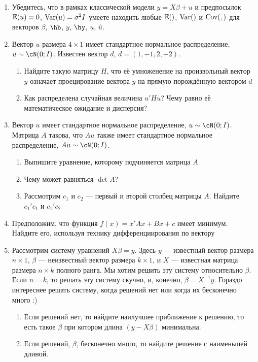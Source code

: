 \documentclass[12pt, a4paper]{article}
\theoremstyle{definition}
\begin{document}
\begin{enumerate}

\item Убедитесь, что в рамках классической модели $y=X\beta + u$ и предпосылок $\mathbb{E}(u) = 0$, $\operatorname{Var}(u) = \sigma^2 I$  умеете находить любые $\mathbb{E}()$, $\operatorname{Var}()$ и $\operatorname{Cov}(,)$ для векторов $\beta$, $\hb$, $y$, $\hy$, $u$, $\hat u$.

\item Вектор $u$ размера $4 \times 1$ имеет стандартное нормальное распределение, $u \sim \cN (0; I)$. Известен вектор $d$, $d=(1, -1, 2, -2)$.

\begin{enumerate}
  \item Найдите такую матрицу $H$, что её умноженение на произвольный вектор $y$ означает проецирование вектора $y$ на прямую порождённую вектором $d$
  \item Как распределена случайная величина $u' H u$? Чему равно её математическое ожидание и дисперсия?
\end{enumerate}

\item Вектор $u$ имеет стандартное нормальное распределение, $u \sim \cN (0; I)$. Матрица $A$ такова, что $Au$ также имеет стандартное нормальное распределение, $Au \sim \cN(0;I)$.
\begin{enumerate}
  \item Выпишите уравнение, которому подчиняется матрица $A$
  \item Чему может равняться $\det A$?
  \item Рассмотрим $c_1$ и $c_2$ — первый и второй столбец матрицы $A$. Найдите $c_1'c_1$ и $c_1'c_2$
\end{enumerate}

\item Предположим, что функция $f(x) = x'Ax + Bx + c$ имеет минимум. Найдите его, используя технику дифференциирования по вектору

\item Рассмотрим систему уравнений $X\beta = y$. Здесь $y$ — известный вектор размера $n\times 1$, $\beta$ — неизвестный вектор размера $k\times 1$, и $X$ — известная матрица размера $n\times k$ полного ранга. Мы хотим решить эту систему относительно $\beta$. Если $n=k$, то решать эту систему скучно, и, конечно, $\beta = X^{-1}y$. Гораздо интереснее решать систему, когда решений нет или когда их бесконечно много :)

\begin{enumerate}
\item Если решений нет, то найдите наилучшее приближение к решению, то есть такое $\beta$ при котором длина $(y-X\beta)$ минимальна.
\item Если решений, $\beta$, бесконечно много, то найдите решение с наименьшей длиной.
\end{enumerate}


\end{enumerate}
\end{document}
